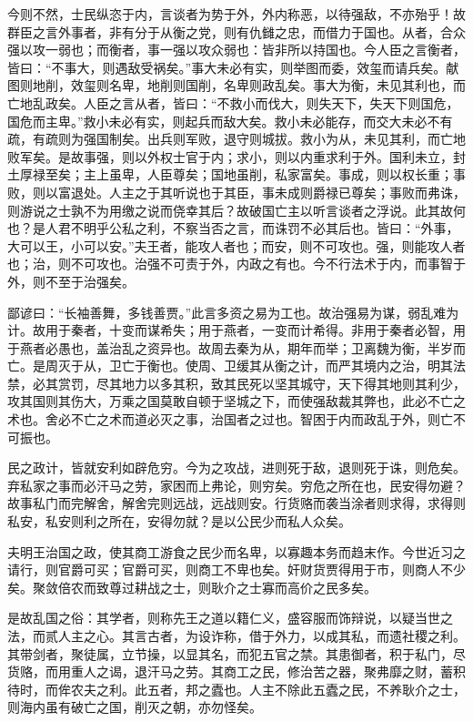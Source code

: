 \documentclass[]{article}
\begin{document}
今则不然，士民纵恣于内，言谈者为势于外，外内称恶，以待强敌，不亦殆乎！故群臣之言外事者，非有分于从衡之党，则有仇雠之忠，而借力于国也。从者，合众强以攻一弱也；而衡者，事一强以攻众弱也：皆非所以持国也。今人臣之言衡者，皆曰：``不事大，则遇敌受祸矣。''事大未必有实，则举图而委，效玺而请兵矣。献图则地削，效玺则名卑，地削则国削，名卑则政乱矣。事大为衡，未见其利也，而亡地乱政矣。人臣之言从者，皆曰：``不救小而伐大，则失天下，失天下则国危，国危而主卑。''救小未必有实，则起兵而敌大矣。救小未必能存，而交大未必不有疏，有疏则为强国制矣。出兵则军败，退守则城拔。救小为从，未见其利，而亡地败军矣。是故事强，则以外权士官于内；求小，则以内重求利于外。国利未立，封土厚禄至矣；主上虽卑，人臣尊矣；国地虽削，私家富矣。事成，则以权长重；事败，则以富退处。人主之于其听说也于其臣，事未成则爵禄已尊矣；事败而弗诛，则游说之士孰不为用缴之说而侥幸其后？故破国亡主以听言谈者之浮说。此其故何也？是人君不明乎公私之利，不察当否之言，而诛罚不必其后也。皆曰：``外事，大可以王，小可以安。''夫王者，能攻人者也；而安，则不可攻也。强，则能攻人者也；治，则不可攻也。治强不可责于外，内政之有也。今不行法术于内，而事智于外，则不至于治强矣。

鄙谚曰：``长袖善舞，多钱善贾。''此言多资之易为工也。故治强易为谋，弱乱难为计。故用于秦者，十变而谋希失；用于燕者，一变而计希得。非用于秦者必智，用于燕者必愚也，盖治乱之资异也。故周去秦为从，期年而举；卫离魏为衡，半岁而亡。是周灭于从，卫亡于衡也。使周、卫缓其从衡之计，而严其境内之治，明其法禁，必其赏罚，尽其地力以多其积，致其民死以坚其城守，天下得其地则其利少，攻其国则其伤大，万乘之国莫敢自顿于坚城之下，而使强敌裁其弊也，此必不亡之术也。舍必不亡之术而道必灭之事，治国者之过也。智困于内而政乱于外，则亡不可振也。

民之政计，皆就安利如辟危穷。今为之攻战，进则死于敌，退则死于诛，则危矣。弃私家之事而必汗马之劳，家困而上弗论，则穷矣。穷危之所在也，民安得勿避？故事私门而完解舍，解舍完则远战，远战则安。行货赂而袭当涂者则求得，求得则私安，私安则利之所在，安得勿就？是以公民少而私人众矣。

夫明王治国之政，使其商工游食之民少而名卑，以寡趣本务而趋末作。今世近习之请行，则官爵可买；官爵可买，则商工不卑也矣。奸财货贾得用于市，则商人不少矣。聚敛倍农而致尊过耕战之士，则耿介之士寡而高价之民多矣。

是故乱国之俗：其学者，则称先王之道以籍仁义，盛容服而饰辩说，以疑当世之法，而贰人主之心。其言古者，为设诈称，借于外力，以成其私，而遗社稷之利。其带剑者，聚徒属，立节操，以显其名，而犯五官之禁。其患御者，积于私门，尽货赂，而用重人之谒，退汗马之劳。其商工之民，修治苦之器，聚弗靡之财，蓄积待时，而侔农夫之利。此五者，邦之蠹也。人主不除此五蠹之民，不养耿介之士，则海内虽有破亡之国，削灭之朝，亦勿怪矣。
\end{document}
